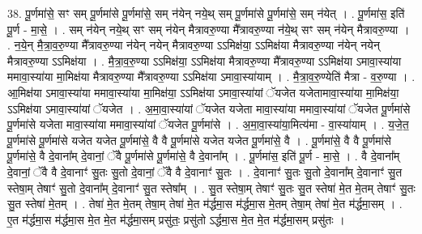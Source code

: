 \documentclass[17pt]{extarticle}
\begin{document}
38. पू॒र्णमा॑से॒ सꣳ सम् पू॒र्णमा॑से पू॒र्णमा॑से॒ सम् न॑येन् नये॒थ् सम् पू॒र्णमा॑से पू॒र्णमा॑से॒ सम् न॑येत् । . पू॒र्णमा॑स॒ इति॑ पू॒र्ण - मा॒से॒ । . सम् न॑येन् नये॒थ् सꣳ सम् न॑येन् मैत्रावरु॒ण्या मै᳚त्रावरु॒ण्या न॑ये॒थ् सꣳ सम् न॑येन् मैत्रावरु॒ण्या । . न॒ये॒न् मै॒त्रा॒व॒रु॒ण्या मै᳚त्रावरु॒ण्या न॑येन् नयेन् मैत्रावरु॒ण्या ऽऽमिक्ष॑या॒ ऽऽमिक्ष॑या मैत्रावरु॒ण्या न॑येन् नयेन् मैत्रावरु॒ण्या ऽऽमिक्ष॑या । . मै॒त्रा॒व॒रु॒ण्या ऽऽमिक्ष॑या॒ ऽऽमिक्ष॑या मैत्रावरु॒ण्या मै᳚त्रावरु॒ण्या ऽऽमिक्ष॑या ऽमावा॒स्या॑या ममावा॒स्या॑या मा॒मिक्ष॑या मैत्रावरु॒ण्या मै᳚त्रावरु॒ण्या ऽऽमिक्ष॑या ऽमावा॒स्या॑याम् । . मै॒त्रा॒व॒रु॒ण्येति॑ मैत्रा - व॒रु॒ण्या । . आ॒मिक्ष॑या ऽमावा॒स्या॑या ममावा॒स्या॑या मा॒मिक्ष॑या॒ ऽऽमिक्ष॑या ऽमावा॒स्या॑यां ॅयजेत यजेतामावा॒स्या॑या मा॒मिक्ष॑या॒ ऽऽमिक्ष॑या ऽमावा॒स्या॑यां ॅयजेत । . अ॒मा॒वा॒स्या॑यां ॅयजेत यजेता मावा॒स्या॑या ममावा॒स्या॑यां ॅयजेत पू॒र्णमा॑से पू॒र्णमा॑से यजेता मावा॒स्या॑या ममावा॒स्या॑यां ॅयजेत पू॒र्णमा॑से । . अ॒मा॒वा॒स्या॑या॒मित्य॑मा - वा॒स्या॑याम् । . य॒जे॒त॒ पू॒र्णमा॑से पू॒र्णमा॑से यजेत यजेत पू॒र्णमा॑से॒ वै वै पू॒र्णमा॑से यजेत यजेत पू॒र्णमा॑से॒ वै । . पू॒र्णमा॑से॒ वै वै पू॒र्णमा॑से पू॒र्णमा॑से॒ वै दे॒वाना᳚म् दे॒वानां॒ ॅवै पू॒र्णमा॑से पू॒र्णमा॑से॒ वै दे॒वाना᳚म् । . पू॒र्णमा॑स॒ इति॑ पू॒र्ण - मा॒से॒ । . वै दे॒वाना᳚म् दे॒वानां॒ ॅवै वै दे॒वानाꣳ॑ सु॒तः सु॒तो दे॒वानां॒ ॅवै वै दे॒वानाꣳ॑ सु॒तः । . दे॒वानाꣳ॑ सु॒तः सु॒तो दे॒वाना᳚म् दे॒वानाꣳ॑ सु॒त स्तेषा॒म् तेषाꣳ॑ सु॒तो दे॒वाना᳚म् दे॒वानाꣳ॑ सु॒त स्तेषा᳚म् । . सु॒त स्तेषा॒म् तेषाꣳ॑ सु॒तः सु॒त स्तेषा॑ मे॒त मे॒तम् तेषाꣳ॑ सु॒तः सु॒त स्तेषा॑ मे॒तम् । . तेषा॑ मे॒त मे॒तम् तेषा॒म् तेषा॑ मे॒त म॑र्द्धमा॒स म॑र्द्धमा॒स मे॒तम् तेषा॒म् तेषा॑ मे॒त म॑र्द्धमा॒सम् । . ए॒त म॑र्द्धमा॒स म॑र्द्धमा॒स मे॒त मे॒त म॑र्द्धमा॒सम् प्रसु॑तः॒ प्रसु॑तो ऽर्द्धमा॒स मे॒त मे॒त म॑र्द्धमा॒सम् प्रसु॑तः । \newline
\end{document}
